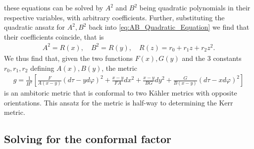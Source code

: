 \documentclass[10pt]{report}
\theoremstyle{definition}
\begin{document}
these equations can be solved by $A^2$ and $B^2$ being quadratic polynomials in their respective variables, with arbitrary coefficients. Further, 
substituting the quadratic ansatz for $A^2,B^2$ back into \cref{eq:AB_Quadratic_Equation} we find that their coefficients coincide, that is 
\begin{align}
    A^2 = R(x), \quad B^2 = R(y),\quad R(z) = r_0 + r_1 z + r_2 z^2. \label{eq:AmbiToric_AB_R_Solution}
\end{align}
We thus find that, given the two functions $F(x),G(y)$ and the 3 constants $r_0,r_1,r_2$ defining $A(x),B(y)$, the metric 
\begin{align}
    g = \frac{1}{H^2} \left[ \frac{F}{A(x-y)} (d\tau-yd\varphi)^2 + \frac{x-y}{FA} dx^2 + \frac{x-y}{BG} dy^2 + \frac{G}{B(x-y)} (d\tau-x d\varphi)^2 \right] \label{eq:GeneralAmbitoric_Metric}
\end{align}
is an ambitoric metric that is conformal to two K\"ahler metrics with opposite orientations. This ansatz for the metric is half-way to determining the Kerr metric. 


\subsection{Solving for the conformal factor}
\end{document}
